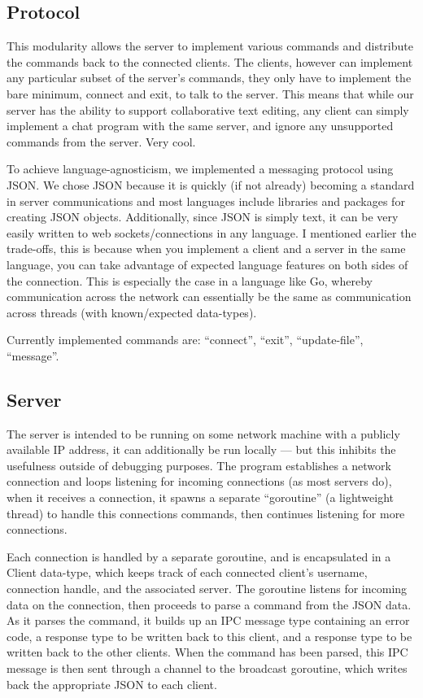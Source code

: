 \documentclass[12pt, letterpaper]{article}
\begin{document}
\subsection*{Protocol}

This modularity allows the server to implement various commands and
distribute the commands back to the connected clients. The clients,
however can implement any particular subset of the server's commands,
they only have to implement the bare minimum, connect and exit, to talk
to the server. This means that while our server has the ability to
support collaborative text editing, any client can simply implement a
chat program with the same server, and ignore any unsupported commands
from the server. Very cool.

To achieve language-agnosticism, we implemented a messaging protocol using
JSON. We chose JSON because it is quickly (if not already) becoming a
standard in server communications and most languages include libraries and
packages for creating JSON objects. Additionally, since JSON is simply
text, it can be very easily written to web sockets/connections in any
language. I mentioned earlier the trade-offs, this is because when you
implement a client and a server in the same language, you can take
advantage of expected language features on both sides of the
connection. This is especially the case in a language like Go, whereby
communication across the network can essentially be the same as
communication across threads (with known/expected data-types).

Currently implemented commands are: ``connect'', ``exit'',
``update-file'', ``message''.

\subsection*{Server}

The server is intended to be running on some network machine with a
publicly available IP address, it can additionally be run locally ---
but this inhibits the usefulness outside of debugging purposes. The
program establishes a network connection and loops listening for
incoming connections (as most servers do), when it receives a
connection, it spawns a separate ``goroutine'' (a lightweight thread)
to handle this connections commands, then continues listening for more
connections.

Each connection is handled by a separate goroutine, and is encapsulated
in a Client data-type, which keeps track of each connected client's
username, connection handle, and the associated server. The goroutine
listens for incoming data on the connection, then proceeds to parse a
command from the JSON data. As it parses the command, it builds up an
IPC message type containing an error code, a response type to be
written back to this client, and a response type to be written back to
the other clients. When the command has been parsed, this IPC message
is then sent through a channel to the broadcast goroutine, which writes
back the appropriate JSON to each client.
\end{document}
